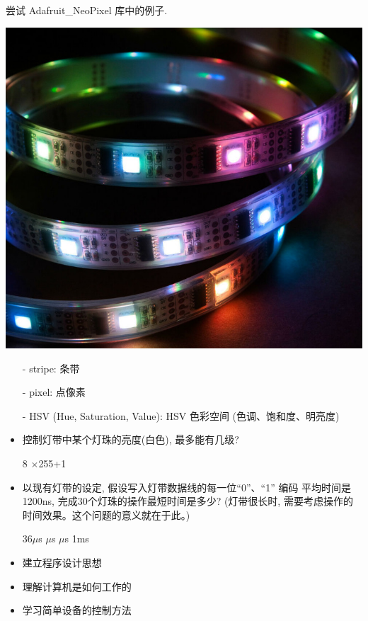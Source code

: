\documentclass[a4paper,11pt]{seminar}
\begin{document}
尝试 Adafruit\_NeoPixel 库中的例子.

\begin{center}
\includegraphics[width=.4\textwidth]{colorful}
\end{center}
\endslide


\begin{itemize}
    \item[-] stripe: 条带
    \item[-] pixel: 点像素
    \item[-] HSV (Hue, Saturation, Value): HSV 色彩空间 (色调、饱和度、明亮度)
\end{itemize}
\endslide


\begin{itemize}
    \item 控制灯带中某个灯珠的亮度(白色), 最多能有几级?

    8\qquad{} \qquad{}\qquad{}$\times$255+1
    \item 以现有灯带的设定, 假设写入灯带数据线的每一位``0''、``1'' 编码
        平均时间是1200ns, 完成30个灯珠的操作最短时间是多少?
        (灯带很长时, 需要考虑操作的时间效果。这个问题的意义就在于此。)

    36$\mu$s \qquad{}$\mu$s \qquad{}$\mu$s \qquad\qquad 1ms
\end{itemize}
\endslide

\setcounter{slidesection}{-1}

\begin{itemize}
    \item 建立程序设计思想
    \item 理解计算机是如何工作的
    \item 学习简单设备的控制方法
\end{itemize}
\endslide
\end{document}
